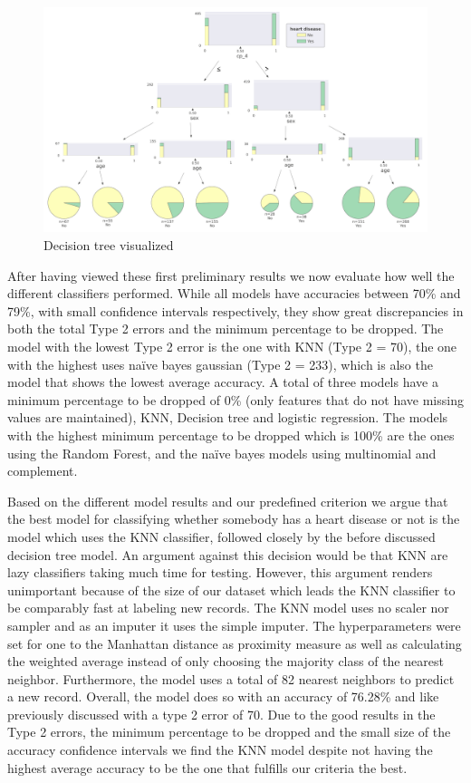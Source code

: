 \begin{figure}[htbp]
	\centering
	\includegraphics[width=\textwidth]{images/DecisionTree.png}
	\caption{Decision tree visualized}
	\label{fig:DecisionTree}
\end{figure}

After having viewed these first preliminary results we now evaluate how well the different classifiers performed. While all models have accuracies between 70\% and 79\%, with small confidence intervals respectively, they show great discrepancies in both the total Type 2 errors and the minimum percentage to be dropped. The model with the lowest Type 2 error is the one with KNN (Type 2 = 70), the one with the highest uses naïve bayes gaussian (Type 2 = 233), which is also the model that shows the lowest average accuracy. A total of three models have a minimum percentage to be dropped of 0\% (only features that do not have missing values are maintained), KNN, Decision tree and logistic regression. The models with the highest minimum percentage to be dropped which is 100\% are the ones using the Random Forest, and the naïve bayes models using multinomial and complement. 

Based on the different model results and our predefined criterion we argue that the best model for classifying whether somebody has a heart disease or not is the model which uses the KNN classifier, followed closely by the before discussed decision tree model. An argument against this decision would be that KNN are lazy classifiers taking much time for testing. However, this argument renders unimportant because of the size of our dataset which leads the KNN classifier to be comparably fast at labeling new records. The KNN model uses no scaler nor sampler and as an imputer it uses the simple imputer. The hyperparameters were set for one to the Manhattan distance as proximity measure as well as calculating the weighted average instead of only choosing the majority class of the nearest neighbor. Furthermore, the model uses a total of 82 nearest neighbors to predict a new record. Overall, the model does so with an accuracy of 76.28\% and like previously discussed with a type 2 error of 70. Due to the good results in the Type 2 errors, the minimum percentage to be dropped and the small size of the accuracy confidence intervals we find the KNN model despite not having the highest average accuracy to be the one that fulfills our criteria the best. 


